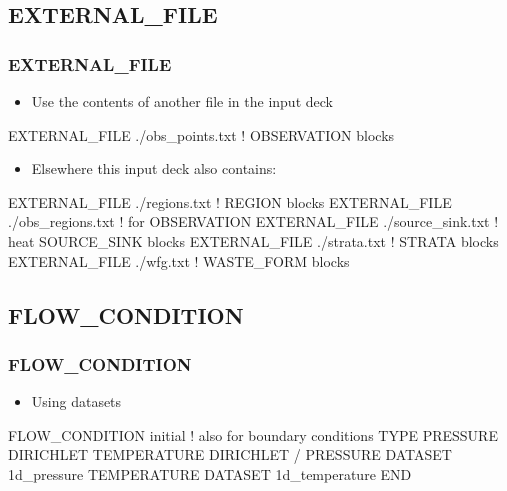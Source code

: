 \documentclass{beamer}
\newcommand\redcomment[1]{{{\color{red} #1}}}
\newcommand\bluecomment[1]{{{\color{blue} #1}}}
\begin{document}
\subsection{EXTERNAL\_FILE}

\begin{frame}[fragile]\frametitle{EXTERNAL\_FILE}
\begin{itemize}
  \item Use the contents of another file in the input deck
\end{itemize}

\begin{semiverbatim}
EXTERNAL_FILE ./obs_points.txt \bluecomment{! OBSERVATION blocks}
\end{semiverbatim}

\begin{itemize}
  \item Elsewhere this input deck also contains:
\end{itemize}

\begin{semiverbatim}
EXTERNAL_FILE ./regions.txt \bluecomment{! REGION blocks}
EXTERNAL_FILE ./obs_regions.txt \bluecomment{! for OBSERVATION} 
EXTERNAL_FILE ./source_sink.txt \bluecomment{! heat SOURCE_SINK blocks}
EXTERNAL_FILE ./strata.txt \bluecomment{! STRATA blocks}
EXTERNAL_FILE ./wfg.txt \bluecomment{! WASTE_FORM blocks}
\end{semiverbatim}

\end{frame}

\subsection{FLOW\_CONDITION}

\begin{frame}[fragile]\frametitle{FLOW\_CONDITION}
\begin{itemize}
  \item{Using \redcomment{datasets}}
\end{itemize}

\begin{semiverbatim}
FLOW_CONDITION initial \bluecomment{! also for boundary conditions}
  TYPE
    PRESSURE DIRICHLET
    TEMPERATURE DIRICHLET
  /
  PRESSURE DATASET 1d_pressure
  TEMPERATURE DATASET 1d_temperature
END

\end{semiverbatim}
\end{frame}
\end{document}
